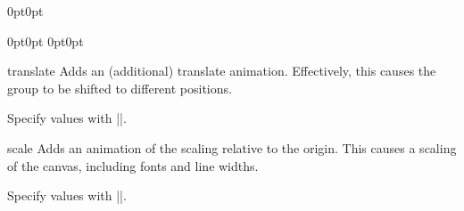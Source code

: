 \begin{command}{\pgfsys@animation@canvas@transform{}}
\begin{codeexample}[
    width=9.9cm,
    preamble={\usetikzlibrary{animations}},
    animation list={0.5,1,1.5,2},
]
\animationcanvasexample
{}
{}
\end{codeexample}
\begin{codeexample}[
    width=9.9cm,
    preamble={\usetikzlibrary{animations}},
    animation list={0.5,1,1.5,2},
]
\animationcanvasexample
{\pgfsys@transformshift{10mm}{0mm}}
{\pgfsys@transformshift{-10mm}{0mm}}
\end{codeexample}
\begin{codeexample}[
    width=9.9cm,
    preamble={\usetikzlibrary{animations}},
    animation list={0.5,1,1.5,2},
]
\animationcanvasexample
{
                    {0pt}{0pt}}
{}
\end{codeexample}
\begin{codeexample}[
    width=9.9cm,
    preamble={\usetikzlibrary{animations}},
    animation list={0.5,1,1.5,2},
]
\animationcanvasexample
{
                    {0pt}{0pt}}
{
                    {0pt}{0pt}}
\end{codeexample}
\end{command}

\begin{sysanimateattribute}{translate}
    Adds an (additional) translate animation. Effectively, this causes the
    group to be shifted to different positions.

    Specify values with |\pgfsysanimvaltranslate|.
\begin{codeexample}[
    preamble={\usetikzlibrary{animations}},
    animation list={0.5,1,1.5,2},
]
\end{codeexample}
\end{sysanimateattribute}

\begin{sysanimateattribute}{scale}
    Adds an animation of the scaling relative to the origin. This causes a
    scaling of the canvas, including fonts and line widths.

    Specify values with |\pgfsysanimvalscale|.
\begin{codeexample}[
    preamble={\usetikzlibrary{animations}},
    animation list={0.5,1,1.5,2},
]
\end{codeexample}
\end{sysanimateattribute}

